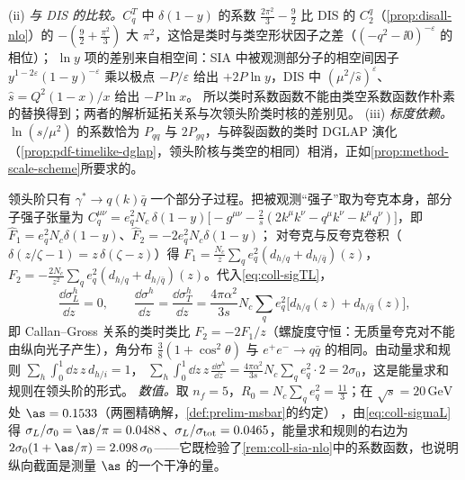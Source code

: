 \begin{remark}[系数函数与检验]
(ii) \emph{与 DIS 的比较。}$C^T_q$ 中 $\delta(1-y)$ 的系数 $\frac{2\pi^2}3-\frac92$ 比 DIS 的 $C_2^q$（\cref{prop:disall-nlo}）的 $-(\frac92+\frac{\pi^2}3)$ 大 $\pi^2$，这恰是类时与类空形状因子之差（$(-q^2-\ii0)^{-\varepsilon}$ 的相位）；%
$\ln y$ 项的差别来自相空间：SIA 中被观测部分子的相空间因子 $y^{1-2\varepsilon}(1-y)^{-\varepsilon}$ 乘以极点 $-P/\varepsilon$ 给出 $+2P\ln y$，DIS 中 $(\mu^2/\hat s)^\varepsilon$、$\hat s=Q^2(1-x)/x$ 给出 $-P\ln x$。
所以类时系数函数不能由类空系数函数作朴素的替换得到；两者的解析延拓关系与次领头阶类时核的差别见\cite{CurciFurmanskiPetronzio1980}。
(iii) \emph{标度依赖。}$\ln(s/\mu^2)$ 的系数恰为 $P_{qq}$ 与 $2P_{gq}$，与碎裂函数的类时 DGLAP 演化（\cref{prop:pdf-timelike-dglap}，领头阶核与类空的相同\cite{GribovLipatov1972b}）相消，正如\cref{prop:method-scale-scheme}所要求的。
\end{remark}

\begin{example}[领头阶 $e^+e^-\to hX$]\label{ex:coll-sia-lo}
领头阶只有 $\gamma^*\to q(k)\bar q$ 一个部分子过程。把被观测“强子”取为夸克本身，部分子强子张量为
$C^{\mu\nu}_q=e_q^2N_c\,\delta(1-y)\big[-g^{\mu\nu}-\frac2s(2k^\mu k^\nu-q^\mu k^\nu-k^\mu q^\nu)\big]$\cite[式~(12.26)]{Collins2011}，即 $\hat F_1=e_q^2N_c\delta(1-y)$、$\hat F_2=-2e_q^2N_c\delta(1-y)$；
对夸克与反夸克卷积（$\delta(z/\zeta-1)=z\,\delta(\zeta-z)$）得 $F_1=\frac{N_c}z\sum_qe_q^2(d_{h/q}+d_{h/\bar q})(z)$，$F_2=-\frac{2N_c}{z^2}\sum_qe_q^2(d_{h/q}+d_{h/\bar q})(z)$。代入\cref{eq:coll-sigTL}，
\begin{equation}\label{eq:coll-sia-lo}
\frac{\dd\sigma^h_L}{\dd z}=0,\qquad \frac{\dd\sigma^h}{\dd z}=\frac{\dd\sigma^h_T}{\dd z}=\frac{4\pi\alpha^2}{3s}N_c\sum_qe_q^2\big[d_{h/q}(z)+d_{h/\bar q}(z)\big],
\end{equation}
即 Callan--Gross 关系的类时类比 $F_2=-2F_1/z$（螺旋度守恒：无质量夸克对不能由纵向光子产生），角分布 $\frac38(1+\cos^2\theta)$ 与 $e^+e^-\to q\bar q$ 的相同。由动量求和规则 $\sum_h\int_0^1\dd z\,z\,d_{h/i}=1$，
$\sum_h\int_0^1\dd z\,z\,\frac{\dd\sigma^h}{\dd z}=\frac{4\pi\alpha^2}{3s}N_c\sum_qe_q^2\cdot2=2\sigma_0$，这是能量求和规则在领头阶的形式。
\emph{数值。}取 $n_f=5$，$R_0=N_c\sum_qe_q^2=\frac{11}3$；在 $\sqrt s=20\,\mathrm{GeV}$ 处 $\as=0.1533$（两圈精确解，\cref{def:prelim-msbar}的约定）%
，由\cref{eq:coll-sigmaL}得 $\sigma_L/\sigma_0=\as/\pi=0.0488$、$\sigma_L/\sigma_{\rm tot}=0.0465$，能量求和规则的右边为 $2\sigma_0(1+\as/\pi)=2.098\,\sigma_0$——它既检验了\cref{rem:coll-sia-nlo}中的系数函数，也说明纵向截面是测量 $\as$ 的一个干净的量。%
\end{example}
